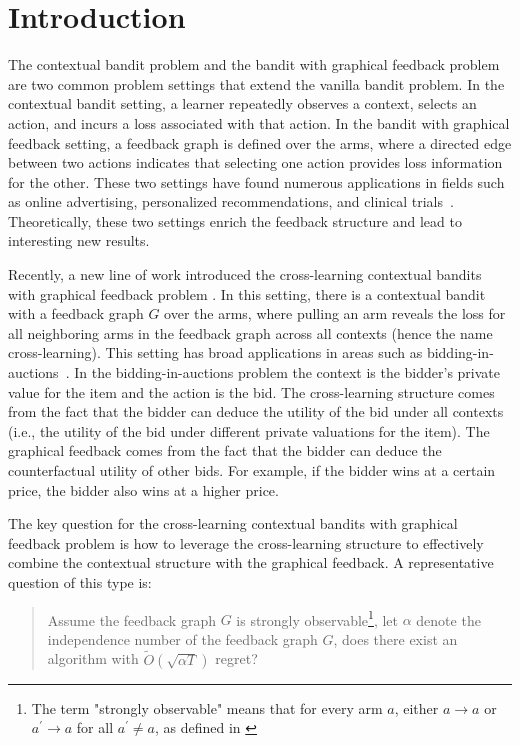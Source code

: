 \section{Introduction}


The contextual bandit problem and the bandit with graphical feedback problem are two common problem settings that extend the vanilla bandit problem.
%
In the contextual bandit setting, a learner repeatedly observes a context, selects an action, and incurs a loss associated with that action.
%
In the bandit with graphical feedback setting, a feedback graph is defined over the arms, where a directed edge between two actions indicates that selecting one action provides loss information for the other.
%
These two settings have found numerous applications in fields such as online advertising, personalized recommendations, and clinical trials~\citep{background_Schapire_2010,backgroundref_Kale_2010,background_villar_2015}.
%
Theoretically, these two settings enrich the feedback structure and lead to interesting new results.

Recently, a new line of work introduced the cross-learning contextual bandits with graphical feedback problem \citep{Han24,MAS24}. 
%
In this setting, there is a contextual bandit with a feedback graph $G$ over the arms, where pulling an arm reveals the loss for all neighboring arms in the feedback graph across all contexts (hence the name cross-learning). 
%
This setting has broad applications in areas such
as bidding-in-auctions~\citep{Han24}.
%
In the bidding-in-auctions problem the context is the bidder’s private value for the item and the action is the bid.
%
The cross-learning structure comes from the fact that the bidder can deduce the utility of the bid under all contexts (i.e., the utility of the bid under different private valuations for the item).
%
The graphical feedback comes from the fact that the bidder can deduce the counterfactual utility of other bids. 
%
For example, if the bidder wins at a certain price, the bidder also wins at a higher price.

The key question for the cross-learning contextual bandits with graphical feedback problem is how to leverage the cross-learning structure to effectively combine the contextual structure with the graphical feedback.
%
A representative question of this type is:
\begin{quote}
Assume the feedback graph $G$ is strongly observable\footnote{The term "strongly observable" means that for every arm $a$, either $a \rightarrow a$ or $a^{\prime} \rightarrow a$ for all $a^{\prime} \neq a$, as defined in \citet{GraphAlon15}}, let $\alpha$ denote the independence number of the feedback graph $G$, does there exist an algorithm with $\widetilde{O}(\sqrt{\alpha T})$ regret?
\end{quote}

